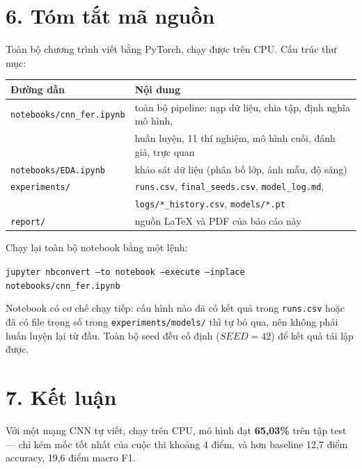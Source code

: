\documentclass[a4paper,12pt]{article}
\begin{document}
\newpage

\section*{6. Tóm tắt mã nguồn}

Toàn bộ chương trình viết bằng PyTorch, chạy được trên CPU. Cấu trúc thư mục:

\begin{center}
\small
\begin{tabular}{ll}
\toprule
Đường dẫn & Nội dung \\
\midrule
\texttt{notebooks/cnn\_fer.ipynb} & toàn bộ pipeline: nạp dữ liệu, chia tập, định nghĩa mô hình, \\
 & huấn luyện, 11 thí nghiệm, mô hình cuối, đánh giá, trực quan \\
\texttt{notebooks/EDA.ipynb} & khảo sát dữ liệu (phân bố lớp, ảnh mẫu, độ sáng) \\
\texttt{experiments/} & \texttt{runs.csv}, \texttt{final\_seeds.csv}, \texttt{model\_log.md}, \\
 & \texttt{logs/*\_history.csv}, \texttt{models/*.pt} \\
\texttt{report/} & nguồn LaTeX và PDF của báo cáo này \\
\bottomrule
\end{tabular}
\end{center}

Chạy lại toàn bộ notebook bằng một lệnh:

\begin{center}
\texttt{jupyter nbconvert --to notebook --execute --inplace notebooks/cnn\_fer.ipynb}
\end{center}

Notebook có cơ chế chạy tiếp: cấu hình nào đã có kết quả trong \texttt{runs.csv} hoặc đã có file
trọng số trong \texttt{experiments/models/} thì tự bỏ qua, nên không phải huấn luyện lại từ đầu.
Toàn bộ seed đều cố định ($SEED = 42$) để kết quả tái lập được.

\newpage

\section*{7. Kết luận}

Với một mạng CNN tự viết, chạy trên CPU, mô hình đạt \textbf{65,03\%} trên tập test — chỉ kém mốc
tốt nhất của cuộc thi khoảng 4 điểm, và hơn baseline 12,7 điểm accuracy, 19,6 điểm macro F1.
\end{document}
